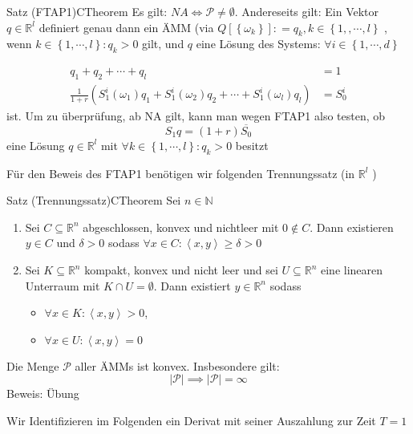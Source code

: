 \documentclass[11.5 pt, a4paper]{memoir}
\begin{document}
\begin{ibox}[2.8]{Satz (FTAP1)}{CTheorem}
	Es gilt: $ NA \iff \mathcal{P} \neq \emptyset $.
	Andereseits gilt: Ein Vektor $ q \in \mathbb{R}^{l} $ definiert genau dann ein ÄMM (via $ Q \left[ \left\{ \omega_k \right\}  \right] : = q_k, k \in \left\{ 1, , \cdots,  l \right\}  $ , wenn $ k \in \left\{  1, \cdots,  l \right\} : q_k > 0 $ gilt, und $ q $ 
	eine Lösung des Systems: $ \forall i \in\left\{ 1 , \cdots,  d \right\}  $ 

	\begin{align*}
		q_1 + q_2 + \cdots + q_{l} &= 1 \\
		\frac{1}{1+r} \left( S_1^{i} (\omega_1) q_1 +   S_1^{i} (\omega_2) q_2  + \cdots +   S_1^{i} (\omega_l) q_l \right) &= S_0^{i}
	\end{align*}
ist. Um zu überprüfung, ab NA gilt, kann man wegen FTAP1 also testen, ob 
$$ S_1 q = (1+r) \overline{ S_0}  $$
eine Lösung $ q \in \mathbb{R}^{l} $ mit $ \forall k \in \left\{ 1 , \cdots,  l \right\} : q_k > 0 $ besitzt
\end{ibox}
Für den Beweis des FTAP1 benötigen wir folgenden Trennungssatz (in $ \mathbb{R}^{l} $ )

\begin{ibox}[2.9]{Satz (Trennungssatz)}{CTheorem}
	Sei $ n \in \mathbb{N} $ 
	\begin{enumerate}[label=\alph*)]
		\item Sei $ C \subseteq \mathbb{R}^n $ abgeschlossen, konvex und nichtleer mit $ 0 \notin C $. Dann existieren $ y \in C $ und 
			$ \delta > 0 $ sodass $ \forall x \in C : \left<x,y \right> \geq \delta > 0 $ 
		\item Sei $ K \subseteq \mathbb{R}^n $ kompakt, konvex und nicht leer und sei $ U \subseteq \mathbb{R}^n $ eine linearen Unterraum
			mit $ K \cap U = \emptyset $. Dann existiert $ y \in \mathbb{R}^n $ sodass
			\begin{itemize}
				\item $ \forall x \in K : \left<x, y \right> >0$,
				\item $ \forall x \in U : \left<x,y \right> = 0 $ 
			\end{itemize}
	\end{enumerate}
\end{ibox}

Die Menge $ \mathcal{P} $ aller ÄMMs ist konvex. Insbesondere gilt:
$$ \left| \mathcal{P} \right| \implies | \mathcal{P}| = \infty $$
Beweis: Übung

Wir Identifizieren im Folgenden ein Derivat mit seiner Auszahlung zur Zeit $ T=1 $ 
\end{document}
